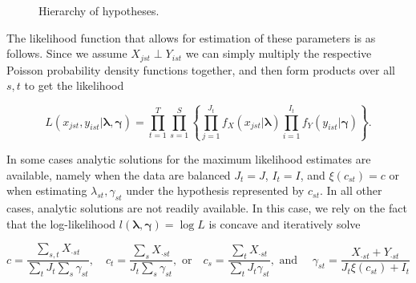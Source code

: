\begin{figure}[h]
  \centering
  
  \caption{Hierarchy of hypotheses.}
  \label{fig:hier}
\end{figure}

The likelihood function that allows for estimation of these parameters is as follows.  Since we assume $X_{jst} \perp Y_{ist}$ we can simply multiply the respective Poisson probability density functions together, and then form products over all $s,t$ to get the likelihood 

\begin{equation}
  \label{eq:likelihood}
  L(x_{jst}, y_{ist} |\boldsymbol{\lambda}, \boldsymbol{\gamma}) = \prod_{t = 1}^{T} \prod_{s=1}^S \left\{ \prod_{j=1}^{J_t} f_X(x_{jst}|\boldsymbol{\lambda}) \prod_{i=1}^{I_t} f_Y(y_{ist} | \boldsymbol{\gamma}) \right\}.
\end{equation}

\noindent In some cases analytic solutions for the maximum likelihood estimates are available, namely when the data are balanced $J_t = J$, $I_t = I$, and $\xi(c_{st}) = c$ or when estimating $\lambda_{st}, \gamma_{st}$ under the hypothesis represented by $c_{st}$.  In all other cases, analytic solutions are not readily available.  In this case, we rely on the fact that the log-likelihood $l(\boldsymbol{\lambda}, \boldsymbol{\gamma}) = \log{L}$ is concave and iteratively solve 

\begin{equation*}
  c = \frac{\sum_{s,t} X_{\cdot st}}{\sum_t J_t \sum_s \gamma_{st}}, \quad c_t =  \frac{\sum_s X_{\cdot st}}{J_t \sum_s \gamma_{st}}, \text{ or} \quad c_s = \frac{\sum_{t}X_{\cdot st}}{\sum_t J_t \gamma_{st}}, \text{ and } \quad \gamma_{st} = \frac{X_{\cdot st} + Y_{\cdot st}}{J_t\xi(c_{st}) + I_t}
\end{equation*}

